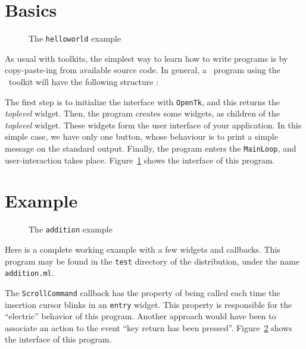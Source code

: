 \section{Basics}
\begin{latexonly}
\begin{figure}
\caption{The {\tt helloworld} example}
\label{fig:helloworld}
\begin{center}
\leavevmode
{}
\end{center}
\end{figure}
\end{latexonly}


As usual with toolkits, the simplest way to learn how to write programs is
by copy-paste-ing from available source code. In general, a \caml\ program
using the \tk\ toolkit will have the following structure :



The first step is to initialize the interface with \verb|OpenTk|, and this
returns the {\em toplevel} widget.
Then, the program creates some widgets, as children of the {\em toplevel}
widget. These widgets form the user interface of your application. In this
simple case, we have only one button, whose behaviour is to print a simple
message on the standard output. Finally, the program enters the
\verb|MainLoop|, and user-interaction takes
place. Figure~\ref{fig:helloworld} shows the interface of this program.


\section{Example}
\begin{latexonly}
\begin{figure}
\caption{The {\tt addition} example}
\label{fig:addition}
\begin{center}
\leavevmode
{}
\end{center}
\end{figure}
\end{latexonly}


Here is a complete working example with a few widgets and callbacks.
This program may be found in the \verb|test| directory of the distribution,
under the name \verb|addition.ml|.



The \verb|ScrollCommand| callback has the property of being called each time
the insertion cursor blinks in an \verb|entry| widget. This property is
responsible for the ``electric'' behavior of this program. Another approach
would have been to associate an action to the event ``key return has been 
pressed''. Figure~\ref{fig:addition} shows the interface of this program.

